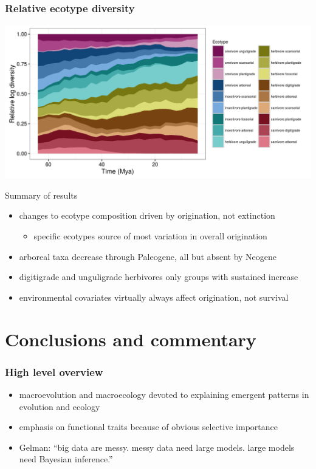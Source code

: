 \documentclass{beamer}
\begin{document}
\begin{frame}
  \frametitle{Relative ecotype diversity}
  \begin{center}
    \includegraphics[height=0.8\textheight,width=\textwidth,keepaspectratio=true]{figure/relative_diversity}
  \end{center}
\end{frame}

\begin{frame}
  \begin{block}{Summary of results}
    \begin{itemize}
      \item changes to ecotype composition driven by origination, not extinction
        \begin{itemize}
          \item specific ecotypes source of most variation in overall origination
        \end{itemize}
      \item arboreal taxa decrease through Paleogene, all but absent by Neogene
      \item digitigrade and unguligrade herbivores only groups with sustained increase
      \item environmental covariates virtually always affect origination, not survival
    \end{itemize}
  \end{block}
\end{frame}


\endgroup


\section{Conclusions and commentary}
\begin{frame}
  \frametitle{High level overview}
  \begin{itemize}
    \item macroevolution and macroecology devoted to explaining emergent patterns in evolution and ecology
    \item emphasis on functional traits because of obvious selective importance
    \item Gelman: ``big data are messy. messy data need large models. large models need Bayesian inference.''
  \end{itemize}
\end{frame}
\end{document}
